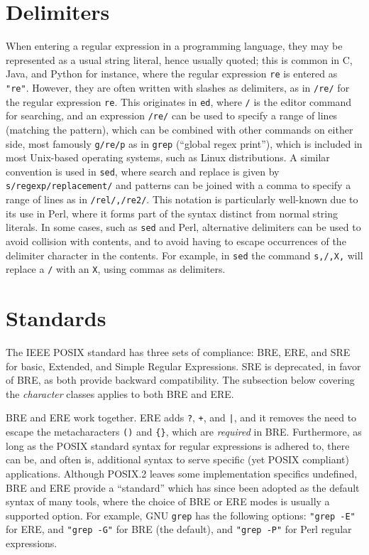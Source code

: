 \section{Delimiters}
When entering a regular expression in a programming language, they may
be represented as a usual string literal, hence usually quoted; this
is common in C, Java, and Python for instance, where the regular
expression \verb|re| is entered as \verb|"re"|. However, they are
often written with slashes as delimiters, as in \verb|/re/| for the
regular expression \verb|re|. This originates in \verb|ed|, where
\verb|/| is the editor command for searching, and an expression
\verb|/re/| can be used to specify a range of lines (matching the
pattern), which can be combined with other commands on either side,
most famously \verb|g/re/p| as in \verb|grep| (``global regex
print''), which is included in most Unix-based operating systems, such
as Linux distributions. A similar convention is used in \verb|sed|,
where search and replace is given by \verb|s/regexp/replacement/| and
patterns can be joined with a comma to specify a range of lines as in
\verb|/rel/,/re2/|. This notation is particularly well-known due to
its use in Perl, where it forms part of the syntax distinct from
normal string literals. In some cases, such as \verb|sed| and Perl,
alternative delimiters can be used to avoid collision with contents,
and to avoid having to escape occurrences of the delimiter character
in the contents. For example, in \verb|sed| the command \verb|s,/,X,|
will replace a \verb|/| with an \verb|X|, using commas as delimiters.

\section{Standards}
The IEEE POSIX standard has three sets of compliance: BRE, ERE, and
SRE for basic, Extended, and Simple Regular Expressions. SRE is
deprecated, in favor of BRE, as both provide backward
compatibility. The subsection below covering the \textsl{character}
classes applies to both BRE and ERE.

BRE and ERE work together. ERE adds \verb|?|, \verb|+|, and \verb/|/,
and it removes the need to escape the metacharacters \verb|()| and
\verb|{}|, which are \textsl{required} in BRE. Furthermore, as long as
the POSIX standard syntax for regular expressions is adhered to, there
can be, and often is, additional syntax to serve specific (yet POSIX
compliant) applications. Although POSIX.2 leaves some implementation
specifics undefined, BRE and ERE provide a ``standard'' which has
since been adopted as the default syntax of many tools, where the
choice of BRE or ERE modes is usually a supported option. For example,
GNU \verb|grep| has the following options: \verb|"grep -E"| for ERE,
and \verb|"grep -G"| for BRE (the default), and \verb|"grep -P"| for
Perl regular expressions.

